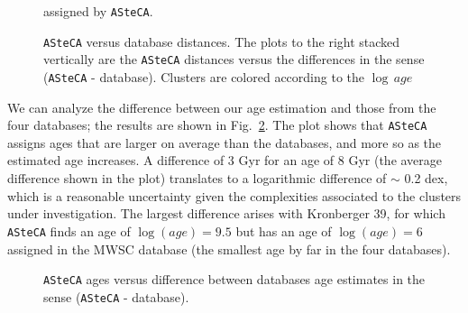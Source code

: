 \documentclass[draft]{aa}
\begin{document}
  \begin{figure}
   \caption{\texttt{ASteCA} versus database distances. The plots to the right
   stacked vertically are the \texttt{ASteCA} distances versus the differences
   in the sense (\texttt{ASteCA} - database). Clusters are colored according to
   the $\log\,age$} assigned by \texttt{ASteCA}.
   \label{fig:distances}
  \end{figure}

  We can analyze the difference between our age estimation and those from
  the four databases; the results are shown in Fig.~\ref{fig:ages}. The plot
  shows that \texttt{ASteCA} assigns ages that are larger on average than the
  databases, and more so as the estimated age increases. A difference of 3 Gyr
  for an age of 8 Gyr (the average difference shown in the plot) translates to a
  logarithmic difference of $\sim$ 0.2 dex, which is a reasonable uncertainty
  given the complexities associated to the clusters under investigation. The
  largest difference arises with Kronberger 39, for which \texttt{ASteCA} finds
  an age of $\log(age)=9.5$ but has an age of $\log(age)=6$ assigned in the
  MWSC database (the smallest age by far in the four databases).\\

  \begin{figure}
   \caption{\texttt{ASteCA} ages versus difference between databases age
   estimates in the sense (\texttt{ASteCA} - database).}
   \label{fig:ages}
  \end{figure}
\end{document}
